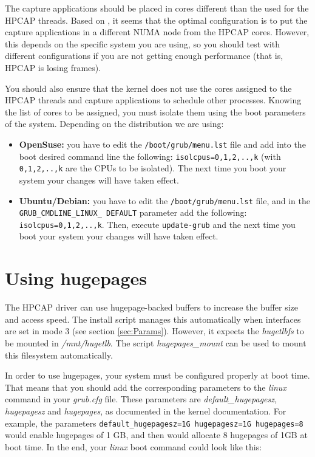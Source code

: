 \documentclass[a4paper,oneside]{hpman}
\begin{document}
The capture applications should be placed in cores different than the used for the HPCAP threads. Based on \cite{m3omon}, it seems that the optimal configuration is to put the capture applications in a different NUMA node from the HPCAP cores. However, this depends on the specific system you are using, so you should test with different configurations if you are not getting enough performance (that is, HPCAP is losing frames).

You should also ensure that the kernel does not use the cores assigned to the HPCAP threads and capture applications to schedule other processes. Knowing the list of cores to be assigned, you must isolate them using the boot parameters of the system. Depending on the distribution we are using:

\begin{itemize}
    \item \textbf{OpenSuse:} you have to edit the \texttt{/boot/grub/menu.lst} file and add into the boot desired command line the following: \texttt{isolcpus=0,1,2,..,k} (with \texttt{0,1,2,..,k} are the CPUs to be isolated). The next time you boot your system your changes will have taken effect.

    \item \textbf{Ubuntu/Debian:} you have to edit the \texttt{/boot/grub/menu.lst} file, and in the \texttt{GRUB\_CMDLINE\_LINUX\_ DEFAULT} parameter add the following: \texttt{isolcpus=0,1,2,..,k}. Then, execute \texttt{update-grub} and the next time you boot your system your changes will have taken effect.

\end{itemize}

\section{Using hugepages}
\label{sec:Hugepages}

The HPCAP driver can use hugepage-backed buffers to increase the buffer size and access speed. The install script manages this automatically when interfaces are set in mode 3 (see section \ref{sec:Params}). However, it expects the \textit{hugetlbfs} to be mounted in \textit{/mnt/hugetlb}. The script \textit{hugepages\_mount} can be used to mount this filesystem automatically.

In order to use hugepages, your system must be configured properly at boot time. That means that you should add the corresponding parameters to the \textit{linux} command in your \textit{grub.cfg} file. These parameters are \textit{default\_hugepagesz, hugepagesz} and \textit{hugepages}, as documented in the kernel documentation. For example, the parameters \texttt{default\_hugepagesz=1G hugepagesz=1G hugepages=8} would enable hugepages of 1 GB, and then would allocate 8 hugepages of 1GB at boot time. In the end, your \textit{linux} boot command could look like this:
\end{document}
